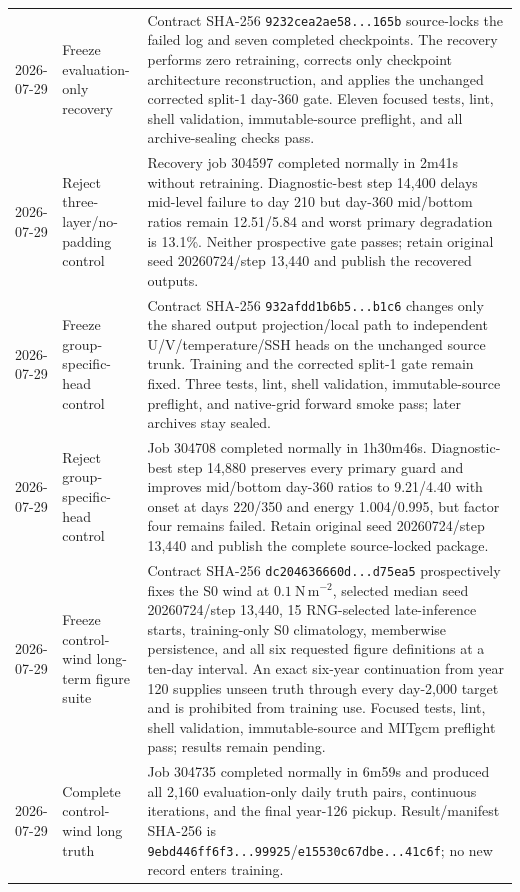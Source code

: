 \documentclass[11pt]{article}
\begin{document}
\begin{longtable}{@{}p{}p{}p{}@{}}
2026-07-29 & Freeze evaluation-only recovery & Contract SHA-256 \texttt{9232cea2ae58...165b} source-locks the failed log and seven completed checkpoints.  The recovery performs zero retraining, corrects only checkpoint architecture reconstruction, and applies the unchanged corrected split-1 day-360 gate.  Eleven focused tests, lint, shell validation, immutable-source preflight, and all archive-sealing checks pass. \\
2026-07-29 & Reject three-layer/no-padding control & Recovery job 304597 completed normally in 2m41s without retraining.  Diagnostic-best step 14,400 delays mid-level failure to day 210 but day-360 mid/bottom ratios remain 12.51/5.84 and worst primary degradation is 13.1\%.  Neither prospective gate passes; retain original seed 20260724/step 13,440 and publish the recovered outputs. \\
2026-07-29 & Freeze group-specific-head control & Contract SHA-256 \texttt{932afdd1b6b5...b1c6} changes only the shared output projection/local path to independent U/V/temperature/SSH heads on the unchanged source trunk.  Training and the corrected split-1 gate remain fixed.  Three tests, lint, shell validation, immutable-source preflight, and native-grid forward smoke pass; later archives stay sealed. \\
2026-07-29 & Reject group-specific-head control & Job 304708 completed normally in 1h30m46s.  Diagnostic-best step 14,880 preserves every primary guard and improves mid/bottom day-360 ratios to 9.21/4.40 with onset at days 220/350 and energy 1.004/0.995, but factor four remains failed.  Retain original seed 20260724/step 13,440 and publish the complete source-locked package. \\
2026-07-29 & Freeze control-wind long-term figure suite & Contract SHA-256 \texttt{dc204636660d...d75ea5} prospectively fixes the S0 wind at \(0.1~\mathrm{N\,m^{-2}}\), selected median seed 20260724/step 13,440, 15 RNG-selected late-inference starts, training-only S0 climatology, memberwise persistence, and all six requested figure definitions at a ten-day interval.  An exact six-year continuation from year 120 supplies unseen truth through every day-2,000 target and is prohibited from training use.  Focused tests, lint, shell validation, immutable-source and MITgcm preflight pass; results remain pending. \\
2026-07-29 & Complete control-wind long truth & Job 304735 completed normally in 6m59s and produced all 2,160 evaluation-only daily truth pairs, continuous iterations, and the final year-126 pickup.  Result/manifest SHA-256 is \texttt{9ebd446ff6f3...99925}/\texttt{e15530c67dbe...41c6f}; no new record enters training. \\

\end{longtable}
\end{document}
